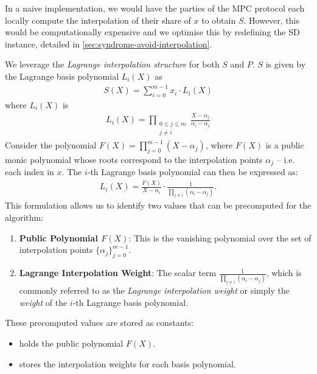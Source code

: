 \documentclass[11pt]{report}
\theoremstyle{definition}
\theoremstyle{plain}
\newcommand{\todo}[1]{{\color[rgb]{.5,0,0}\textbf{$\blacktriangleright$#1$\blacktriangleleft$}}}
\begin{document}
In a naive implementation, we would have the parties of the MPC protocol each locally compute the interpolation of their share of $x$ to obtain $S$. However, this would be computationally expensive and we optimise this by redefining the SD instance, detailed in \autoref{sec:syndrome-avoid-interpolation}.

We leverage the \textit{Lagrange interpolation structure} for both $S$ and $P$. $S$ is given by the Lagrange basis polynomial $L_i(X)$ as
\begin{align*}
  S(X) = \sum_{i=0}^{m-1} x_i \cdot L_i(X)
\end{align*}
where $L_i(X)$ is
\begin{align*}
  L_i(X) = \prod_{\substack{0\leq j\leq m \\ j\neq i}} \frac{X-\alpha_j}{\alpha_i-\alpha_j}
\end{align*}
Consider the polynomial $F(X) = \prod_{j=0}^{m-1} (X - \alpha_j)$, where $F(X)$ is a public monic polynomial whose roots correspond to the interpolation points $\alpha_j$ -- i.e. each index in $x$. The $i$-th Lagrange basis polynomial can then be expressed as:
\begin{align*}
  L_i(X) = \frac{F(X)}{X - \alpha_i} \cdot \frac{1}{\prod_{j \neq i} (\alpha_i - \alpha_j)}.
\end{align*}
This formulation allows us to identify two values that can be precomputed for the algorithm:

\begin{enumerate}
  \item \textbf{Public Polynomial $F(X)$}: This is the vanishing polynomial over the set of interpolation points $\{\alpha_j\}_{j=0}^{m-1}$.
  \item \textbf{Lagrange Interpolation Weight}: The scalar term $\frac{1}{\prod_{j \neq i} (\alpha_i - \alpha_j)}$, which is commonly referred to as the \textit{Lagrange interpolation weight} or simply the \textit{weight} of the $i$-th Lagrange basis polynomial.
\end{enumerate}

These precomputed values are stored as constants:
\begin{itemize}
  \item {} holds the public polynomial $F(X)$.
  \item {} stores the interpolation weights for each basis polynomial.
\end{itemize}
\end{document}
